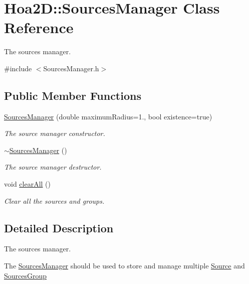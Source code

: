 \hypertarget{class_hoa2_d_1_1_sources_manager}{\section{Hoa2\-D\-:\-:Sources\-Manager Class Reference}
\label{class_hoa2_d_1_1_sources_manager}
}


The sources manager.  




{\ttfamily \#include $<$Sources\-Manager.\-h$>$}

\subsection*{Public Member Functions}
\begin{DoxyCompactItemize}
\item 
\hyperlink{class_hoa2_d_1_1_sources_manager_a9af44e634cc63d77fce116baa8d03886}{Sources\-Manager} (double maximum\-Radius=1., bool existence=true)
\begin{DoxyCompactList}\small\item\em The source manager constructor. \end{DoxyCompactList}\item 
\hyperlink{class_hoa2_d_1_1_sources_manager_ae116065cec424f8c845b8fa4ade1e718}{$\sim$\-Sources\-Manager} ()
\begin{DoxyCompactList}\small\item\em The source manager destructor. \end{DoxyCompactList}\item 
\hypertarget{class_hoa2_d_1_1_sources_manager_a1b248551ce36262e064d88b41eba076b}{void \hyperlink{class_hoa2_d_1_1_sources_manager_a1b248551ce36262e064d88b41eba076b}{clear\-All} ()}\label{class_hoa2_d_1_1_sources_manager_a1b248551ce36262e064d88b41eba076b}

\begin{DoxyCompactList}\small\item\em Clear all the sources and groups. \end{DoxyCompactList}\end{DoxyCompactItemize}


\subsection{Detailed Description}
The sources manager. 

The \hyperlink{class_hoa2_d_1_1_sources_manager}{Sources\-Manager} should be used to store and manage multiple \hyperlink{class_hoa2_d_1_1_source}{Source} and \hyperlink{class_hoa2_d_1_1_sources_group}{Sources\-Group} 

